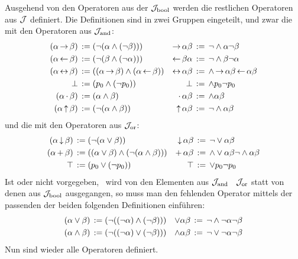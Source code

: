Ausgehend von den Operatoren aus der  $\mathcal{J}_{\mathrm{bool}}$ werden die restlichen Operatoren aus $\mathcal{J}$ definiert. Die Definitionen sind in zwei Gruppen eingeteilt, und zwar die mit den Operatoren aus $\mathcal{J}_{\mathrm{and}}$:
\begin{align}
	(\alpha \limp \beta) &\;\defeq\; (\lnot (\alpha \land  (\lnot \beta))) &
	\limp \alpha \beta   &\;\defeq\;  \lnot    \land \alpha \lnot \beta
	\label{def:imp}
	\\
	(\alpha \lrep \beta) &\;\defeq\; (\lnot (\beta \land  (\lnot \alpha))) &
	\lrep \beta  \alpha  &\;\defeq\;  \lnot    \land \beta \lnot \alpha
	\label{def:rep}
	\\
	(\alpha\lequiv\beta) &\;\defeq\;((\alpha\limp\beta)\land(\alpha\lrep\beta))&
	\lequiv\alpha \beta  &\;\defeq\;\land \limp \alpha \beta \lrep \alpha \beta
	\label{def:equiv}
	\\
	\lfalse              &\;\defeq\; (p_0 \land    (\lnot p_0))    &
	\lfalse              &\;\defeq\;      \land p_0 \lnot p_0   \label{def:false}
	\\
	(\alpha \lmult \beta)&\;\defeq\; (\alpha \land \beta)          &
	\lmult \alpha  \beta &\;\defeq\;  \land \alpha \beta        \label{def:mult}
	\\
	(\alpha \lnand \beta)&\;\defeq\; (\lnot (\alpha \land \beta )) &
	\lnand \alpha  \beta &\;\defeq\;  \lnot  \land \alpha \beta \label{def:nand}
\end{align}
und die mit den Operatoren aus $\mathcal{J}_{\mathrm{or}}$:
\begin{align}
	(\alpha \operatorname{\downarrow} \beta) &\;\operatorname{:\!=}\; (\lnot (\alpha \lor \beta))   &
	\operatorname{\downarrow} \alpha  \beta  & \;\operatorname{:\!=}\;  \lnot  \lor \alpha \beta \label{def:nor}
	\\
	(\alpha\operatorname{+}\beta)&\;\operatorname{:\!=}\;((\alpha\lor\beta)\land(\lnot(\alpha\land\beta)))&
	\operatorname{+}\alpha \beta &\;\operatorname{:\!=}\;  \land \lor\alpha\beta \lnot \land\alpha\beta
	\label{def:add}
	\\
	\top & \;\operatorname{:\!=}\; (p_0 \lor    (\lnot p_0)) &
	\top & \;\operatorname{:\!=}\;      \lor p_0 \lnot p_0
	\label{def:true}
\end{align}
%
Ist \symqt{$\lor$} oder \symqt{$\land$} nicht vorgegeben, \textdh\ wird von den Elementen aus $\mathcal{J}_{\mathrm{and}}$ \textbzgl\ $\mathcal{J}_{\mathrm{or}}$ statt von denen aus $\mathcal{J}_{\mathrm{bool}}$ ausgegangen, so muss man den fehlenden Operator mittels der passenden der beiden folgenden Definitionen einführen:
\begin{align}
	(\alpha \lor \beta)  & \;\operatorname{:\!=}\; (\lnot((\lnot\alpha)\land(\lnot\beta))) &
	\lor \alpha  \beta   & \;\operatorname{:\!=}\;  \lnot \land \lnot \alpha \lnot \beta
	\label{def:orand} \\
	(\alpha \land \beta) & \;\operatorname{:\!=}\; (\lnot((\lnot\alpha)\lor(\lnot\beta)))  &
	\land \alpha  \beta  & \;\operatorname{:\!=}\;  \lnot \lor \lnot \alpha \lnot \beta
	\label{def:andor}
\end{align}
Nun sind wieder alle Operatoren definiert.

